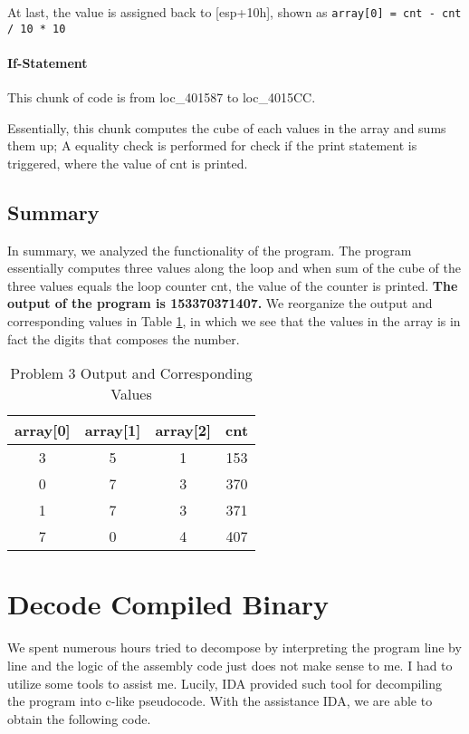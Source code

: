 \documentclass[11pt]{article}
\begin{document}
At last, the value is assigned back to [esp+10h], shown as \lstinline{array[0] = cnt - cnt / 10 * 10}

\paragraph{If-Statement} This chunk of code is from loc\_401587 to loc\_4015CC.

Essentially, this chunk computes the cube of each values in the array and sums them up; A equality check is performed for check if the print statement is triggered, where the value of cnt is printed. 

\subsection{Summary}

In summary, we analyzed the functionality of the program. The program essentially computes three values along the loop and when sum of the cube of the three values equals the loop counter cnt, the value of the counter is printed. \textbf{The output of the program is 153370371407.} We reorganize the output and corresponding values in Table \ref{tab:assembly3}, in which we see that the values in the array is in fact the digits that composes the number. 
\begin{table}[h]
\centering
\begin{tabular}{c|c|c|c}
\hline
array{[}0{]} & array{[}1{]} & array{[}2{]} & cnt \\
\hline
3            & 5            & 1            & 153 \\
0            & 7            & 3            & 370 \\
1            & 7            & 3            & 371 \\
7            & 0            & 4            & 407 \\
\hline
\end{tabular}
\caption{Problem 3 Output and Corresponding Values}
\label{tab:assembly3}
\end{table}


\section{Decode Compiled Binary}

We spent numerous hours tried to decompose by interpreting the program line by line and the logic of the assembly code just does not make sense to me. I had to utilize some tools to assist me. Lucily, IDA provided such tool for decompiling the program into c-like pseudocode. With the assistance IDA, we are able to obtain the following code.
\end{document}
